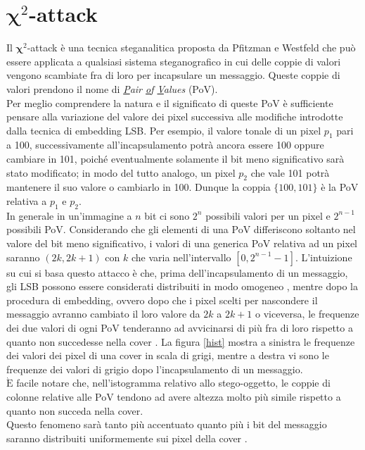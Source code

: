 		\section{$\mathbf{\chi}^2$-attack}
Il $\mathbf{\chi}^2$-attack è una tecnica steganalitica proposta da Pfitzman e Westfeld che può essere applicata a qualsiasi sistema steganografico in cui delle coppie di valori vengono scambiate fra di loro per incapsulare un messaggio. Queste coppie di valori prendono il nome di \textit{\underline{P}air \underline{o}f \underline{V}alues} (PoV).\\Per meglio comprendere la natura e il significato di queste PoV è sufficiente pensare alla variazione del valore dei pixel successiva alle modifiche introdotte dalla tecnica di embedding LSB. Per esempio, il valore tonale di un pixel $p_1$ pari a 100, successivamente all'incapsulamento potrà ancora essere 100 oppure cambiare in 101, poiché eventualmente solamente il bit meno significativo sarà stato modificato; in modo del tutto analogo, un pixel $p_2$ che vale 101 potrà mantenere il suo valore o cambiarlo in 100. Dunque la coppia $\lbrace 100, 101 \rbrace$ è la PoV relativa a $p_1$ e $p_2$.\\In generale in un'immagine a $n$ bit ci sono $2^n$ possibili valori per un pixel e $2^{n-1}$ possibili PoV. Considerando che gli elementi di una PoV differiscono soltanto nel valore del bit meno significativo, i valori di una generica PoV relativa ad un pixel saranno $(2k, 2k+1)$ con $k$ che varia nell'intervallo $[0, 2^{n-1}-1]$. L'intuizione su cui si basa questo attacco è che, prima dell'incapsulamento di un messaggio, gli LSB possono essere considerati distribuiti in modo omogeneo \cite{chisq, survey}, mentre dopo la procedura di embedding, ovvero dopo che i pixel scelti per nascondere il messaggio avranno cambiato il loro valore da $2k$ a $2k+1$ o viceversa, le frequenze dei due valori di ogni PoV tenderanno ad avvicinarsi di più fra di loro rispetto a quanto non succedesse nella cover \cite{chisq}. La figura \ref{hist} mostra a sinistra le frequenze dei valori dei pixel di una cover in scala di grigi, mentre a destra vi sono le frequenze dei valori di grigio dopo l'incapsulamento di un messaggio.\\$\mathrm{\grave{E}}$ facile notare che, nell'istogramma relativo allo stego-oggetto, le coppie di colonne relative alle PoV tendono ad avere altezza molto più simile rispetto a quanto non succeda nella cover.\\Questo fenomeno sarà tanto più accentuato quanto più i bit del messaggio saranno distribuiti uniformemente sui pixel della cover \cite{survey}.  

